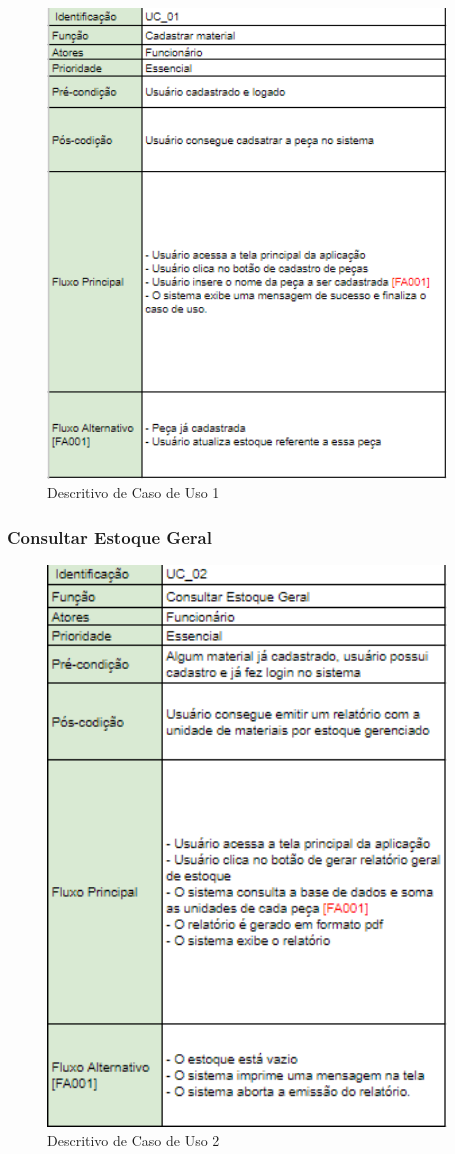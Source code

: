 \documentclass[rascunho,xindy,acronym,symbols]{fei}
\begin{document}
\begin{figure}[H]
    \centering
    \includegraphics[scale=0.6, width=300pt]{./Images/Descritivos/UC1.png}
    \caption{Descritivo de Caso de Uso 1}
    \label{fig:desc_uc1}
\end{figure}

\subsubsection{Consultar Estoque Geral}

\begin{figure}[H]
    \centering
    \includegraphics[scale=0.6, width=300pt]{./Images/Descritivos/UC2.png}
    \caption{Descritivo de Caso de Uso 2}
     \label{fig:desc_uc2}
\end{figure}
\end{document}
